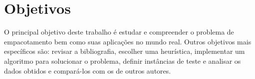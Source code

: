\section{Objetivos}\label{sec:Objetivos}

O principal objetivo deste trabalho é estudar e compreender o problema de empacotamento bem como suas aplicações no mundo real.
Outros objetivos mais específicos são: revisar a bibliografia, escolher uma heurística, implementar um algoritmo para solucionar o problema, definir instâncias de teste e analisar os dados obtidos e compará-los com os de outros autores.
